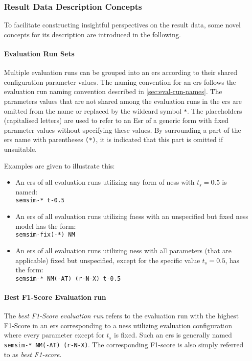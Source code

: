 \documentclass[11pt]{scrreprt}
\begin{document}
{\subsubsection{Result Data Description Concepts}
To facilitate constructing insightful perspectives on the result data, some novel concepts for its description are introduced in the following.

\paragraph{Evaluation Run Sets}
Multiple evaluation runs can be grouped into an \gls{ers} according to their shared configuration parameter values. The naming convention for an \gls{ers} follows the evaluation run naming convention described in \cref{sec:eval-run-names}. The parameters values that are not shared among the evaluation runs in the \gls{ers} are omitted from the name or replaced by the wildcard symbol \texttt{*}. The placeholders (capitalised letters) are used to refer to an E\gls{sr} of a generic form with fixed parameter values without specifying these values.  By surrounding a part of the \gls{ers} name with parentheses \texttt{(*)}, it is indicated that this part is omitted if unsuitable. 

Examples are given to illustrate this:
\begin{itemize}
	\item An \gls{ers} of all evaluation runs utilizing any form of \gls{ness} with \(t_s = 0.5\) is named: \\ \texttt{semsim-* t-0.5}
	\item An \gls{ers} of all evaluation runs utilizing \gls{fness} with an unspecified but fixed \gls{ness} model has the form: \\ \texttt{semsim-fix(-*) NM} 
	\item An \gls{ers} of all evaluation runs utilizing \gls{ness} with all parameters (that are applicable) fixed but unspecified, except for the specific value \(t_s = 0.5\), has the form: \\ \texttt{semsim-* NM(-AT) (r-N-X) t-0.5}
\end{itemize}

\paragraph{Best F1-Score Evaluation run} The \textit{best F1-Score evaluation run} refers to the evaluation run with the highest F1-Score in an \gls{ers} corresponding to a \gls{ness} utilizing evaluation configuration where every parameter except for \(t_s\) is fixed. Such an \gls{ers} is generally named \texttt{semsim-* NM(-AT) (r-N-X)}. The corresponding F1-score is also simply referred to as \textit{best F1-score}.

}
\end{document}

